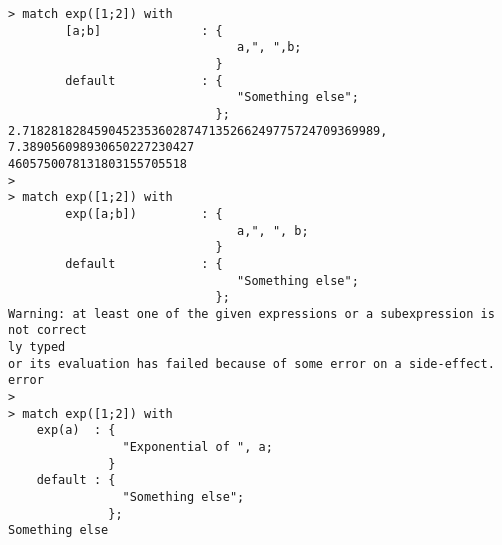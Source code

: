 \begin{center}\begin{minipage}{15cm}\begin{Verbatim}[frame=single]
> match exp([1;2]) with 
        [a;b]              : {
                                a,", ",b;
                             }
        default            : {
                                "Something else";
                             };
2.71828182845904523536028747135266249775724709369989, 7.389056098930650227230427
4605750078131803155705518
> 
> match exp([1;2]) with 
        exp([a;b])         : {
                                a,", ", b;
                             }
        default            : {
                                "Something else";
                             };
Warning: at least one of the given expressions or a subexpression is not correct
ly typed
or its evaluation has failed because of some error on a side-effect.
error
> 
> match exp([1;2]) with 
    exp(a)  : {
                "Exponential of ", a;
              }
    default : {
                "Something else";
              };
Something else
\end{Verbatim}
\end{minipage}\end{center}
